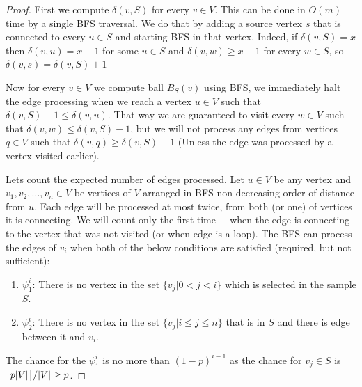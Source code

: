 \documentclass[shortabstract, lic, english]{iithesis}
\theoremstyle{definition} \newtheorem{definition}{Definition}[chapter]
\theoremstyle{plain} \newtheorem{remark}[definition]{Observation}
\theoremstyle{plain} \newtheorem{theorem}[definition]{Theorem}
\theoremstyle{plain} \newtheorem{lemma}[definition]{Lemma}
\theoremstyle{plain} \newtheorem{conjecture}[definition]{Conjecture}
\DeclarePairedDelimiter{\ceil}{\lceil}{\rceil}
\begin{document}
\begin{proof}
    First we compute $\delta(v, S)$ for every $v \in V$. This can be done in $O(m)$ time by a single BFS traversal.
    We do that by adding a source vertex $s$ that is connected to every $u \in S$ and starting BFS in that vertex.
    Indeed, if $\delta(v, S) = x$ then $\delta(v, u) = x - 1$ for some $u \in S$ and $\delta(v, w) \geq x - 1$ for every $w \in S$, so
    $\delta(v, s) = \delta(v, S) + 1$

    Now for every $v \in V$ we compute ball $B_{S}(v)$ using BFS, we immediately halt the edge processing when we reach a vertex $u \in V$ such that $\delta(v,S) - 1 \leq \delta(v, u)$.
    That way we are guaranteed to visit every $w \in V$ such that $\delta(v, w) \leq \delta(v, S) - 1$, but
    we will not process any edges from vertices $q \in V$ such that $\delta(v, q) \geq \delta(v, S) - 1$ (Unless the edge was processed by a vertex visited earlier).

    Lets count the expected number of edges processed. Let $u \in V$ be any vertex and
    $v_1, v_2, \ldots, v_n \in V$ be vertices of $V$ arranged in BFS non-decreasing order of distance from $u$.
    Each edge will be processed at most twice, from both (or one) of vertices it is connecting. We will count only the first time $-$ when the edge is connecting to the vertex that was not visited (or when edge is a loop).
    The BFS can process the edges of $v_i$ when both of the below conditions are satisfied (required, but not sufficient):
    \begin{enumerate}
        \item $\psi_1^i$: There is no vertex in the set $\{v_j |0 < j < i\}$ which is selected in the sample $S$.
        \item $\psi_2^i$: There is no vertex in the set $\{v_j |i \leq j \leq n\}$ that is in $S$ and there is edge between it and $v_i$.
    \end{enumerate} 
    The chance for the $\psi_1^i$ is no more than $(1-p)^{i-1}$ as the chance for $v_j \in S$ is $\ceil[\big]{p  |V|}/|V| \geq p$.
    

\end{proof}
\end{document}
